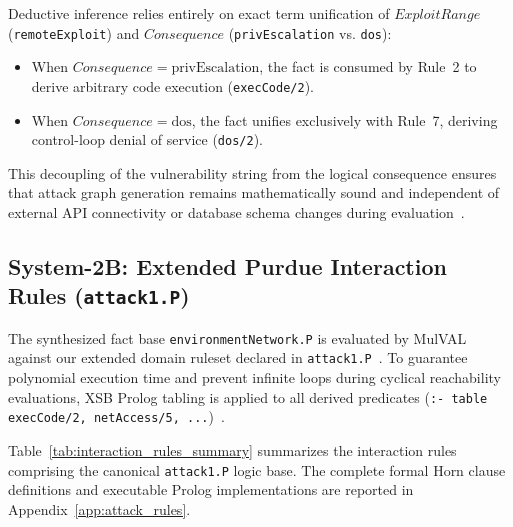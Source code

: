 \documentclass[target=mst,aauheader=aics,style=]{thud}
\begin{document}
Deductive inference relies entirely on exact term unification of $ExploitRange$ (\texttt{remoteExploit}) and $Consequence$ (\texttt{privEscalation} vs. \texttt{dos}):
\begin{itemize}
    \item When $Consequence = \text{privEscalation}$, the fact is consumed by Rule~2 to derive arbitrary code execution (\texttt{execCode/2}).
    \item When $Consequence = \text{dos}$, the fact unifies exclusively with Rule~7, deriving control-loop denial of service (\texttt{dos/2}).
\end{itemize}

This decoupling of the vulnerability string from the logical consequence ensures that attack graph generation remains mathematically sound and independent of external API connectivity or database schema changes during evaluation~\cite{Ou05}.

\subsection{System-2B: Extended Purdue Interaction Rules (\texttt{attack1.P})}
\label{subsec:system2b_rules}

The synthesized fact base \texttt{environmentNetwork.P} is evaluated by MulVAL against our extended domain ruleset declared in \texttt{attack1.P}~\cite{Ou05, SunderOT}. To guarantee polynomial execution time and prevent infinite loops during cyclical reachability evaluations, XSB Prolog tabling is applied to all derived predicates (\texttt{:- table execCode/2, netAccess/5, ...})~\cite{swift2012xsb}.

Table~\ref{tab:interaction_rules_summary} summarizes the interaction rules comprising the canonical \texttt{attack1.P} logic base. The complete formal Horn clause definitions and executable Prolog implementations are reported in Appendix~\ref{app:attack_rules}.
\end{document}
